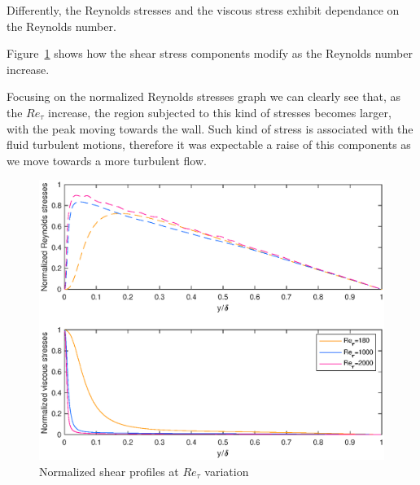 Differently, the Reynolds stresses and the viscous stress exhibit dependance on the Reynolds number.\par
Figure~\ref{shear:comparison} shows how the shear stress components modify as the Reynolds number increase. \par
Focusing on the normalized Reynolds stresses graph we can clearly see that, as the $Re_{\tau}$ increase, the region subjected to this kind of stresses becomes larger, with the peak moving towards the wall. Such kind of stress is associated with the fluid turbulent motions, therefore it was expectable a raise of this components as we move towards a more turbulent flow. \par

\begin{figure}
\begin{center}
\includegraphics[scale=0.55]{grafici/shear_comparison.eps}
\caption{Normalized shear profiles at $Re_{\tau}$ variation}
\label{shear:comparison}
\end{center}
\end{figure}

